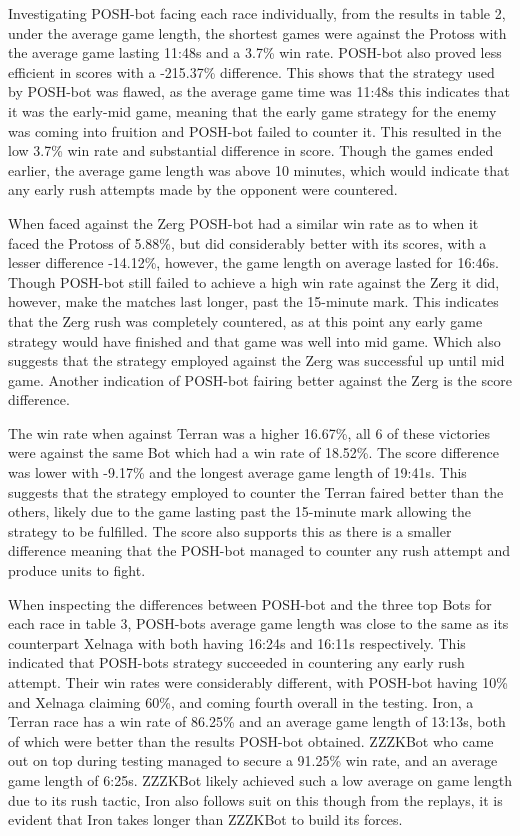 \documentclass[journal]{IEEEtran}
\begin{document}
	Investigating POSH-bot facing each race individually, from the results in table 2, under the average game length, the shortest games were against the Protoss with the average game lasting 11:48s and a 3.7\% win rate. POSH-bot also proved less efficient in scores with a -215.37\% difference. This shows that the strategy used by POSH-bot was flawed, as the average game time was 11:48s this indicates that it was the early-mid game, meaning that the early game strategy for the enemy was coming into fruition and POSH-bot failed to counter it. This resulted in the low 3.7\% win rate and substantial difference in score. Though the games ended earlier, the average game length was above 10 minutes, which would indicate that any early rush attempts made by the opponent were countered.
	
	When faced against the Zerg POSH-bot had a similar win rate as to when it faced the Protoss of 5.88\%, but did considerably better with its scores, with a lesser difference -14.12\%, however, the game length on average lasted for 16:46s. Though POSH-bot still failed to achieve a high win rate against the Zerg it did, however, make the matches last longer, past the 15-minute mark. This indicates that the Zerg rush was completely countered, as at this point any early game strategy would have finished and that game was well into mid game. Which also suggests that the strategy employed against the Zerg was successful up until mid game. Another indication of POSH-bot fairing better against the Zerg is the score difference.
	
	The win rate when against Terran was a higher 16.67\%, all 6 of these victories were against the same Bot which had a win rate of 18.52\%. The score difference was lower with -9.17\% and the longest average game length of 19:41s. This suggests that the strategy employed to counter the Terran faired better than the others, likely due to the game lasting past the 15-minute mark allowing the strategy to be fulfilled. The score also supports this as there is a smaller difference meaning that the POSH-bot managed to counter any rush attempt and produce units to fight.
	
	When inspecting the differences between POSH-bot and the three top Bots for each race in table 3, POSH-bots average game length was close to the same as its counterpart Xelnaga with both having 16:24s and 16:11s respectively. This indicated that POSH-bots strategy succeeded in countering any early rush attempt. Their win rates were considerably different, with POSH-bot having 10\% and Xelnaga claiming 60\%, and coming fourth overall in the testing. Iron, a Terran race has a win rate of 86.25\% and an average game length of 13:13s, both of which were better than the results POSH-bot obtained. ZZZKBot who came out on top during testing managed to secure a 91.25\% win rate, and an average game length of 6:25s. ZZZKBot likely achieved such a low average on game length due to its rush tactic, Iron also follows suit on this though from the replays, it is evident that Iron takes longer than ZZZKBot to build its forces.
	
\end{document}
